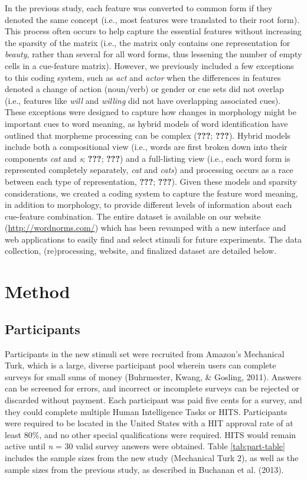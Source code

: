 \documentclass[english,,man]{apa6}
\theoremstyle{definition}
\theoremstyle{definition}
\theoremstyle{definition}
\theoremstyle{remark}
\begin{document}
In the previous study, each feature was converted to common form if they
denoted the same concept (i.e., most features were translated to their
root form). This process often occurs to help capture the essential
features without increasing the sparsity of the matrix (i.e., the matrix
only contains one representation for \emph{beauty}, rather than several
for all word forms, thus lessening the number of empty cells in a
cue-feature matrix). However, we previously included a few exceptions to
this coding system, such as \emph{act} and \emph{actor} when the
differences in features denoted a change of action (noun/verb) or gender
or cue sets did not overlap (i.e., features like \emph{will} and
\emph{willing} did not have overlapping associated cues). These
exceptions were designed to capture how changes in morphology might be
important cues to word meaning, as hybrid models of word identification
have outlined that morpheme processing can be complex ({\textbf{???}};
{\textbf{???}}). Hybrid models include both a compositional view (i.e.,
words are first broken down into their components \emph{cat} and
\emph{s}; {\textbf{???}}; {\textbf{???}}) and a full-listing view (i.e.,
each word form is represented completely separately, \emph{cat} and
\emph{cats}) and processing occurs as a race between each type of
representation, {\textbf{???}}; {\textbf{???}}). Given these models and
sparsity considerations, we created a coding system to capture the
feature word meaning, in addition to morphology, to provide different
levels of information about each cue-feature combination. The entire
dataset is available on our website (\url{http://wordnorms.com/}) which
has been revamped with a new interface and web applications to easily
find and select stimuli for future experiments. The data collection,
(re)processing, website, and finalized dataset are detailed below.

\hypertarget{method}{%
\section{Method}\label{method}}

\hypertarget{participants}{%
\subsection{Participants}\label{participants}}

Participants in the new stimuli set were recruited from Amazon's
Mechanical Turk, which is a large, diverse participant pool wherein
users can complete surveys for small sums of money (Buhrmester, Kwang,
\& Gosling, 2011). Answers can be screened for errors, and incorrect or
incomplete surveys can be rejected or discarded without payment. Each
participant was paid five cents for a survey, and they could complete
multiple Human Intelligence Tasks or HITS. Participants were required to
be located in the United States with a HIT approval rate of at least
80\%, and no other special qualifications were required. HITS would
remain active until \emph{n} = 30 valid survey answers were obtained.
Table \ref{tab:part-table} includes the sample sizes from the new study
(Mechanical Turk 2), as well as the sample sizes from the previous
study, as described in Buchanan et al. (2013).
\end{document}
